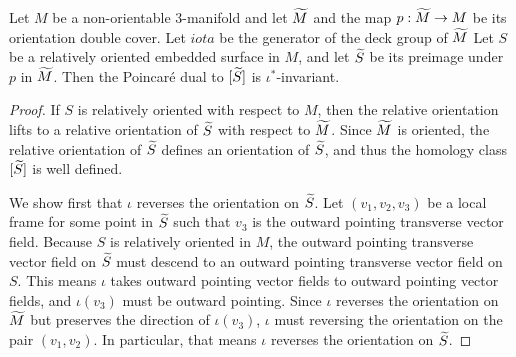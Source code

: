 \begin{lem}
  \label{lem:PD1}
  Let $M$ be a non-orientable 3-manifold and let $\widetilde{M}$ and the map $p:\widetilde{M}\to M$ be its orientation double cover.  Let $iota$ be the generator of the deck group of $\widetilde{M}$
  Let $S$ be a relatively oriented embedded surface in $M$, and let $\widetilde{S}$ be its preimage under $p$ in $\widetilde{M}$.
  Then the Poincar\'e dual to $[\widetilde{S}]$ is $\iota^{\ast}$-invariant.
\end{lem}
\begin{proof}
  If $S$ is relatively oriented with respect to $M$, then the relative orientation lifts to a relative orientation of $\widetilde{S}$ with respect to $\widetilde{M}$.
  Since $\widetilde{M}$ is oriented, the relative orientation of $\widetilde{S}$ defines an orientation of $\widetilde{S}$, and thus the homology class $[\widetilde{S}]$ is well defined.

  We show first that $\iota$ reverses the orientation on $\widetilde{S}$.
  Let $(v_1, v_2, v_3)$ be a local frame for some point in $\widetilde{S}$ such that
  $v_3$ is the outward pointing transverse vector field.
  Because $S$ is relatively oriented in $M$, the outward pointing transverse vector field on $\widetilde{S}$ must descend to an outward pointing transverse vector field on $S$.
  This means $\iota$ takes outward pointing vector fields to outward pointing vector fields, and $\iota(v_3)$ must be outward pointing.
  Since $\iota$ reverses the orientation on $\widetilde{M}$ but preserves the direction of $\iota(v_3)$, $\iota$ must reversing the orientation on the pair $(v_1, v_2)$.
  In particular, that means $\iota$ reverses the orientation on $\widetilde{S}$.


\end{proof}
